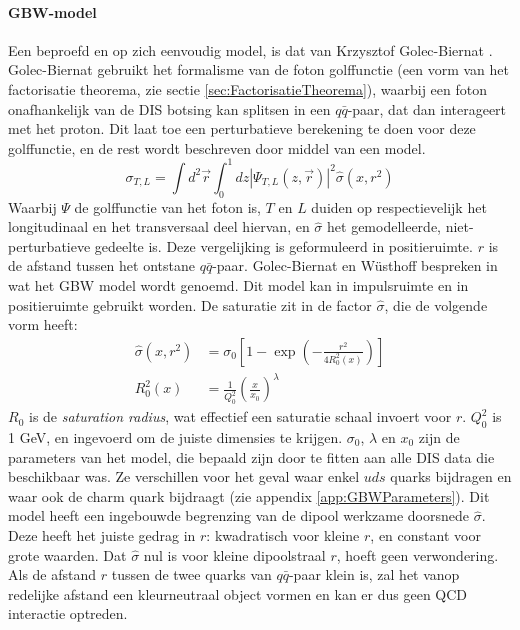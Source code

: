 \documentclass[a4paper,11pt]{article}
\numberwithin{equation}{section} %
\begin{document}
      \paragraph{GBW-model}
Een beproefd en op zich eenvoudig model, is dat van Krzysztof Golec-Biernat \cite{GB}.
Golec-Biernat gebruikt het formalisme van de foton golffunctie (een vorm van het factorisatie theorema, zie sectie \ref{sec:FactorisatieTheorema}), waarbij een foton onafhankelijk van de DIS botsing kan splitsen in een $q\bar{q}$-paar, dat dan interageert met het proton.
Dit laat toe een perturbatieve berekening te doen voor deze golffunctie, en de rest wordt beschreven door middel van een model.
\begin{equation}
\sigma_{T,L} = \int d^2 \vec{r} \int_0^1 dz |\Psi_{T,L} (z, \vec{r})|^2 \hat{\sigma} (x,r^2)
\end{equation}
Waarbij $\Psi$ de golffunctie van het foton is, $T$ en $L$ duiden op respectievelijk het longitudinaal en het transversaal deel hiervan, en $\hat{\sigma}$ het gemodelleerde, niet-perturbatieve gedeelte is.
Deze vergelijking is geformuleerd in positieruimte.
$r$ is de afstand tussen het ontstane $q\bar{q}$-paar.
Golec-Biernat en Wüsthoff bespreken in \cite{GBW} wat het GBW model wordt genoemd.
Dit model kan in impulsruimte en in positieruimte gebruikt worden.
De saturatie zit in de factor $\hat{\sigma}$, die de volgende vorm heeft:
\begin{align}
\hat{\sigma}(x,r^2) &= \sigma_0 \left[ 1- \exp{\left(-\frac{r^2}{4 R_0^2(x)}\right)} \right] \\
R_0^2(x) &= \frac{1}{Q_0^2} \left( \frac{x}{x_0} \right)^\lambda \label{eq:R0}
\end{align}
$R_0$ is de \textit{saturation radius}, wat effectief een saturatie schaal invoert voor $r$.
$Q_0^2$ is 1 GeV, en ingevoerd om de juiste dimensies te krijgen.
$\sigma_0$, $\lambda$ en $x_0$ zijn de parameters van het model, die bepaald zijn door te fitten aan alle DIS data die beschikbaar was.
Ze verschillen voor het geval waar enkel $uds$ quarks bijdragen en waar ook de charm quark bijdraagt (zie appendix \ref{app:GBWParameters}).
Dit model heeft een ingebouwde begrenzing van de dipool werkzame doorsnede $\hat{\sigma}$.
Deze heeft het juiste gedrag in $r$: kwadratisch voor kleine $r$, en constant voor grote waarden.
Dat $\hat{\sigma}$ nul is voor kleine dipoolstraal $r$, hoeft geen verwondering.
Als de afstand $r$ tussen de twee quarks van $q\bar{q}$-paar klein is, zal het vanop redelijke afstand een kleurneutraal object vormen en kan er dus geen QCD interactie optreden.
\end{document}
